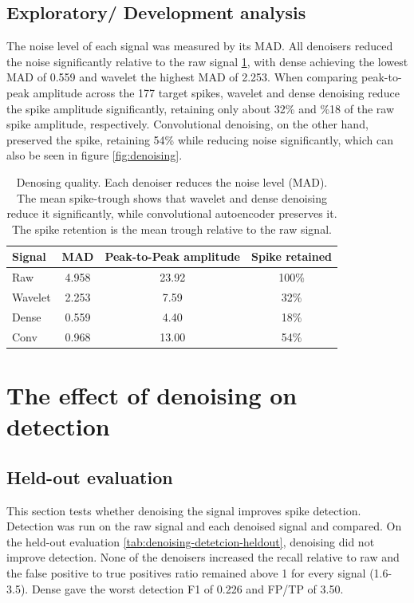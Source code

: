 \documentclass[ %
                    author={Daniel Page},
                supervisor={Dr. Andrew Calway},
                    degree={MSc},
                     title={Some Structural Guidelines for Data Science MSc Theses, Including Those With Long Titles that Run Across Multiple Lines on the Front Page},
                  subtitle={And those including an optional subtitle too, for good measure},
                      type={},
                      year={2021}]{dissertation}
\begin{document}
\subsection{Exploratory/ Development analysis}
The noise level of each signal was measured by its MAD. All denoisers reduced the noise significantly relative to the raw signal \ref{tab:denoising quality}, with dense achieving the lowest MAD of 0.559 and wavelet the highest MAD of 2.253. When comparing peak-to-peak amplitude across the 177 target spikes, wavelet and dense denoising reduce the spike amplitude significantly, retaining only about 32\% and \%18 of the raw spike amplitude, respectively. Convolutional denoising, on the other hand, preserved the spike, retaining 54\% while reducing noise significantly, which can also be seen in figure \ref{fig:denoising}. 
\begin{table}[htbp]
    \centering
    \begin{tabular}{lccc}
    \toprule
    Signal & MAD & Peak-to-Peak amplitude & Spike retained \\
    \midrule
    Raw & 4.958 & 23.92 & 100\% \\
    Wavelet & 2.253 & 7.59 & 32\% \\
    Dense & 0.559 & 4.40 & 18\% \\
    Conv & 0.968 & 13.00 & 54\% \\
    \bottomrule
    \end{tabular}
    \caption{Denosing quality. Each denoiser reduces the noise level (MAD). The mean spike-trough shows that wavelet and dense denoising reduce it significantly, while convolutional autoencoder preserves it. The spike retention is the mean trough relative to the raw signal.}
    \label{tab:denoising quality}
\end{table}

\section{The effect of denoising on detection}
\subsection{Held-out evaluation}
This section tests whether denoising the signal improves spike detection. Detection was run on the raw signal and each denoised signal and compared. 
On the held-out evaluation \ref{tab:denoising-detetcion-heldout}, denoising did not improve detection. None of the denoisers increased the recall relative to raw and the false positive to true positives ratio remained above 1 for every signal (1.6-3.5). Dense gave the worst detection F1 of 0.226 and FP/TP of 3.50.
\end{document}
